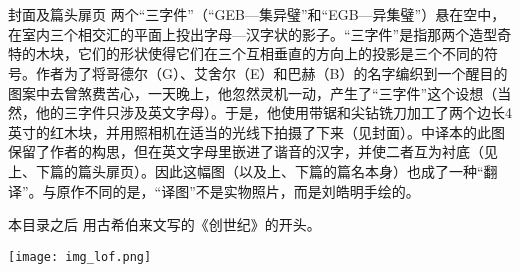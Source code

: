 
\chapter{\listfigurename}

\begin{lof}

\item[封面及篇头扉页]两个“三字件”（“GEB—集异璧”和“EGB—异集璧”）悬在空中，在室内三个相交汇的平面上投出字母—汉字状的影子。“三字件”是指那两个造型奇特的木块，它们的形状使得它们在三个互相垂直的方向上的投影是三个不同的符号。作者为了将哥德尔（G）、艾舍尔（E）和巴赫（B）的名字编织到一个醒目的图案中去曾煞费苦心，一天晚上，他忽然灵机一动，产生了“三字件”这个设想（当然，他的三字件只涉及英文字母）。于是，他使用带锯和尖钻铣刀加工了两个边长4英寸的红木块，并用照相机在适当的光线下拍摄了下来（见封面）。中译本的此图保留了作者的构思，但在英文字母里嵌进了谐音的汉字，并使二者互为衬底（见上、下篇的篇头扉页）。因此这幅图（以及上、下篇的篇名本身）也成了一种“翻译”。与原作不同的是，“译图”不是实物照片，而是刘皓明手绘的。

\item[本目录之后]用古希伯来文写的《创世纪》的开头。

\listoffigures

\end{lof}

\bigskip

\begin{center}
\texttt{[image: img\_lof.png]}
\end{center}
